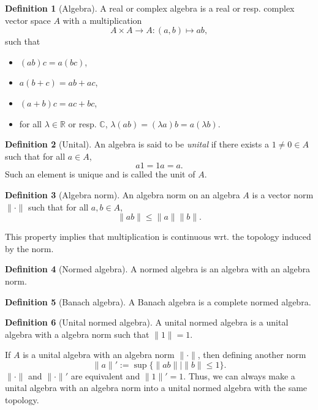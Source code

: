 \documentclass[]{article}
\theoremstyle{definition}
\newtheorem{definition}{Definition}[section]
\begin{document}
\begin{definition}[Algebra]
  A real or complex algebra is a real or resp. complex vector space \(A\) with a multiplication
  \[A \times A \to A : (a, b) \mapsto ab,\]
  such that 
  \begin{itemize}
    \item \((ab)c = a(bc)\),
    \item \(a(b+c) = ab + ac\),
    \item \((a + b)c = ac + bc\),
    \item for all \(\lambda \in \mathbb{R}\) or resp. \(\mathbb{C}\), \(\lambda(ab) = (\lambda a)b = a(\lambda b)\).
  \end{itemize}
\end{definition}

\begin{definition}[Unital]
  An algebra is said to be \textit{unital} if there exists a \(1 \ne 0 \in A\) such that for all \(a \in A\),
  \[a1 = 1a = a.\]
  Such an element is unique and is called the unit of \(A\).
\end{definition}

\begin{definition}[Algebra norm]
  An algebra norm on an algebra \(A\) is a vector norm \(\|\cdot\|\) such that for all \(a, b \in A\), 
  \[\|ab\| \le \|a\| \|b\|.\]
\end{definition}
This property implies that multiplication is continuous wrt. the topology induced by the norm.

\begin{definition}[Normed algebra]
  A normed algebra is an algebra with an algebra norm.
\end{definition}

\begin{definition}[Banach algebra]
  A Banach algebra is a complete normed algebra.
\end{definition}

\begin{definition}[Unital normed algebra]
  A unital normed algebra is a unital algebra with a algebra norm such that \(\|1\| = 1\).
\end{definition}

If \(A\) is a unital algebra with an algebra norm \(\|\cdot\|\), then defining another norm
\[\|a\|' := \sup \{\|ab\| \mid \|b\| \le 1\}.\]
\(\|\cdot\|\) and \(\|\cdot\|'\) are equivalent and \(\|1\|' = 1\). Thus, we can always make a 
unital algebra with an algebra norm into a unital normed algebra with the same topology.
  
\end{document}
